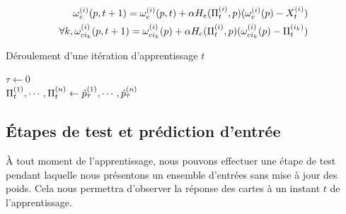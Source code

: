 \documentclass[../main]{subfiles}
\begin{document}
\begin{align}\label{eq:update_general}
 \omega_{e}^{({i})}(p,t+1) = \omega_{e}^{({i})}(p,t) + \alpha H_{e}(\Pi_t^{({i})}, p)(\omega_{e}^{({i})}(p) - X_t^{({i})}) \\
\forall k, \omega_{ci_k}^{({i})}(p,t+1) = \omega_{ci_k}^{({i})}(p) + \alpha H_{c}(\Pi_t^{({i})},p)(\omega_{ci_k}^{({i})}(p) - \Pi^{({i_k})}_t)
\end{align}


\begin{algorithm}\label{algo:cxsom}
\caption{Déroulement d'une itération d'apprentissage $t$}
\SetAlgoLined
  $\tau \leftarrow 0$\\
  $\Pi^{({1})}_t, \cdots, \Pi^{({n})}_t \leftarrow \hat{p}^{({1})}_\tau, \cdots , \hat{p}^{({n})}_\tau$\\
 \end{algorithm}
 
\subsection{\'Etapes de test et prédiction d'entrée}\label{sec:modele_test}

\`A tout moment de l'apprentissage, nous pouvons effectuer une étape de test pendant laquelle nous présentons un ensemble d'entrées sans mise à jour des poids. Cela nous permettra d'observer la réponse des cartes à un instant $t$ de l'apprentissage.
\end{document}
